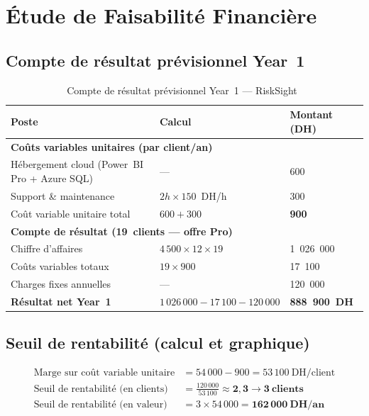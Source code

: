 \documentclass[12pt, a4paper]{report}
\begin{document}
\newpage
\section{Étude de Faisabilité Financière}

\subsection{Compte de résultat prévisionnel Year~1}

\begin{table}[H]
\centering
\caption{Compte de résultat prévisionnel Year~1 --- RiskSight~\cite{tp3_faisabilite}}
\label{tab:cdr}
\renewcommand{\arraystretch}{1.8}
\begin{tabularx}{\textwidth}{X p{4.9cm} p{3cm}}
\toprule
\rowcolor{primary!12}
Poste & Calcul & Montant (DH) \\
\midrule
\multicolumn{3}{l}{\textbf{Coûts variables unitaires (par client/an)}} \\
\quad Hébergement cloud (Power~BI Pro + Azure SQL) & --- & 600 \\
\quad Support \& maintenance & $2h \times 150$~DH/h & 300 \\
\quad Coût variable unitaire total & $600 + 300$ & \textbf{900} \\[4pt]
\multicolumn{3}{l}{\textbf{Compte de résultat (19~clients --- offre Pro)}} \\
Chiffre d'affaires & $4\,500 \times 12 \times 19$ & 1~026~000 \\
Coûts variables totaux & $19 \times 900$ & 17~100 \\
Charges fixes annuelles & --- & 120~000 \\
\midrule
\textbf{Résultat net Year~1} & $1\,026\,000 - 17\,100 - 120\,000$ &
  \textbf{\textcolor{successcolor}{888~900~DH}} \\
\bottomrule
\end{tabularx}
\end{table}

\subsection{Seuil de rentabilité (calcul et graphique)}

\begin{align}
  \text{Marge sur coût variable unitaire}
    &= 54\,000 - 900 = 53\,100 \ \text{DH/client} \\
  \text{Seuil de rentabilité (en clients)}
    &= \frac{120\,000}{53\,100} \approx \mathbf{2{,}3 \rightarrow 3 \ \text{clients}} \\
  \text{Seuil de rentabilité (en valeur)}
    &= 3 \times 54\,000 = \mathbf{162\,000 \ \text{DH/an}}
\end{align}
\end{document}
